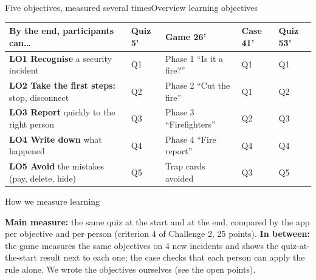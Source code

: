 \documentclass[aspectratio=169,11pt,t]{beamer}
\newcommand\explain[2]{%
  \begin{tcolorbox}[enhanced, colback=white, colframe=white, arc=2mm, boxrule=0pt, left=2.5mm, right=2.5mm, top=1.5mm, bottom=1.5mm,
      before skip=0pt, after skip=1.6mm, drop fuzzy shadow={black!30}, before upper=\raggedright]
    {\headfont\fontsize{8}{10}\selectfont\color{navy}#1\par}\vspace{.5mm}
    {\fontsize{7}{8.6}\selectfont #2\par}
  \end{tcolorbox}}
\begin{document}
\begin{frame}{Five objectives, measured several times}{Overview \textbullet{} learning objectives}
  \vspace{0mm}
  \begin{card}[left=3mm, right=3mm, top=1.5mm, bottom=1mm, after skip=2mm]
    \scriptsize\setlength\tabcolsep{3pt}\renewcommand{\arraystretch}{1.12}
    \begin{tabular}{@{}L{52mm}L{13mm}L{31mm}L{12mm}L{12mm}@{}}
      \textcolor{muted}{By the end, participants can\dots} & \textcolor{muted}{Quiz 5'} & \textcolor{muted}{Game 26'} & \textcolor{muted}{Case 41'} & \textcolor{muted}{Quiz 53'}\\\midrule
      \textbf{LO1 Recognise} a security incident & Q1 & Phase 1 ``Is it a fire?'' & Q1 & Q1\\
      \textbf{LO2 Take the first steps:} stop, disconnect & Q2 & Phase 2 ``Cut the fire'' & Q1 & Q2\\
      \textbf{LO3 Report} quickly to the right person & Q3 & Phase 3 ``Firefighters'' & Q2 & Q3\\
      \textbf{LO4 Write down} what happened & Q4 & Phase 4 ``Fire report'' & Q4 & Q4\\
      \textbf{LO5 Avoid} the mistakes (pay, delete, hide) & Q5 & Trap cards avoided & Q3 & Q5\\
    \end{tabular}
  \end{card}
  \explain{How we measure learning}{\textbf{Main measure:} the same quiz at the start and at the end, compared by the app per objective and per person (criterion 4 of Challenge 2, 25 points). \textbf{In between:} the game measures the same objectives on 4 new incidents and shows the quiz-at-the-start result next to each one; the case checks that each person can apply the rule alone. We wrote the objectives ourselves (see the open points).}
\end{frame}
\end{document}
